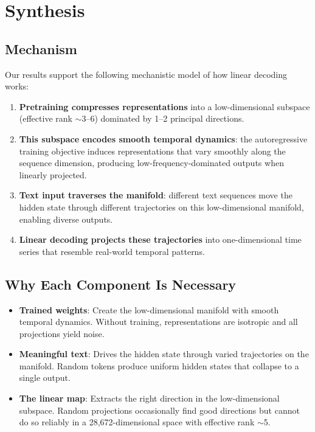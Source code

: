 \documentclass[11pt,a4paper]{article}
\begin{document}
\section{Synthesis}

\subsection{Mechanism}

Our results support the following mechanistic model of how linear decoding works:

\begin{enumerate}[nosep]
    \item \textbf{Pretraining compresses representations} into a low-dimensional subspace (effective rank $\sim$3--6) dominated by 1--2 principal directions.
    \item \textbf{This subspace encodes smooth temporal dynamics}: the autoregressive training objective induces representations that vary smoothly along the sequence dimension, producing low-frequency-dominated outputs when linearly projected.
    \item \textbf{Text input traverses the manifold}: different text sequences move the hidden state through different trajectories on this low-dimensional manifold, enabling diverse outputs.
    \item \textbf{Linear decoding projects these trajectories} into one-dimensional time series that resemble real-world temporal patterns.
\end{enumerate}

\subsection{Why Each Component Is Necessary}

\begin{itemize}[nosep]
    \item \textbf{Trained weights}: Create the low-dimensional manifold with smooth temporal dynamics. Without training, representations are isotropic and all projections yield noise.
    \item \textbf{Meaningful text}: Drives the hidden state through varied trajectories on the manifold. Random tokens produce uniform hidden states that collapse to a single output.
    \item \textbf{The linear map}: Extracts the right direction in the low-dimensional subspace. Random projections occasionally find good directions but cannot do so reliably in a 28{,}672-dimensional space with effective rank $\sim$5.
\end{itemize}
\end{document}
